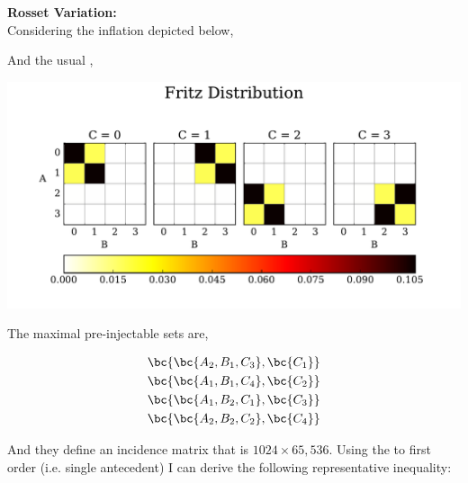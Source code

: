\documentclass[12pt]{article}
\begin{document}
    \textbf{Rosset Variation:}\\

    Considering the  inflation depicted below,

    \begin{center}
        \scalebox{1.0}{}
    \end{center}

    And the usual ,

    \begin{center}
        \includegraphics[width=\linewidth]{../../figures/distributions/fritz_dist_plotted.pdf}
    \end{center}

    The maximal pre-injectable sets are,

    \begin{align*}
        \bc{\bc{A_2, B_1, C_3}, \bc{C_1}} \\
        \bc{\bc{A_1, B_1, C_4}, \bc{C_2}} \\
        \bc{\bc{A_1, B_2, C_1}, \bc{C_3}} \\
        \bc{\bc{A_2, B_2, C_2}, \bc{C_4}} \\
    \end{align*}

    And they define an incidence matrix that is $1024 \times 65,536$. Using the  to first order (i.e. single antecedent) I can derive the following representative inequality:
\end{document}
